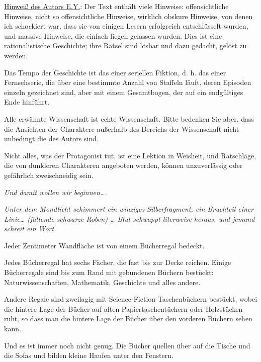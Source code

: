 

\hypertarget{ein-uxe4uuxdferst-unwahrscheinlicher-tag}{%

\uline{Hinweiß des Autors E.Y.}: Der Text enthält viele Hinweise: offensichtliche Hinweise, nicht so offensichtliche Hinweise, wirklich obskure Hinweise, von denen ich schockiert war, dass sie von einigen Lesern erfolgreich entschlüsselt wurden, und massive Hinweise, die einfach liegen gelassen wurden. Dies ist eine rationalistische Geschichte; ihre Rätsel sind lösbar und dazu gedacht, gelöst zu werden.

Das Tempo der Geschichte ist das einer seriellen Fiktion, d. h. das einer Fernsehserie, die über eine bestimmte Anzahl von Staffeln läuft, deren Episoden einzeln gezeichnet sind, aber mit einem Gesamtbogen, der auf ein endgültiges Ende hinführt.

Alle erwähnte Wissenschaft ist echte Wissenschaft. Bitte bedenken Sie aber, dass die Ansichten der Charaktere außerhalb des Bereichs der Wissenschaft nicht unbedingt die des Autors sind.

Nicht alles, was der Protagonist tut, ist eine Lektion in Weisheit, und Ratschläge, die von dunkleren Charakteren angeboten werden, können unzuverlässig oder gefährlich zweischneidig sein.

\emph{Und damit wollen wir beginnen….}

\emph{Unter dem Mondlicht schimmert ein winziges Silberfragment, ein Bruchteil einer Linie… (fallende schwarze Roben) … Blut schwappt literweise heraus, und jemand schreit ein Wort.}

Jeder Zentimeter Wandfläche ist von einem Bücherregal bedeckt.

Jedes Bücherregal hat sechs Fächer, die fast bis zur Decke reichen. Einige Bücherregale sind bis zum Rand mit gebundenen Büchern bestückt: Naturwissenschaften, Mathematik, Geschichte und alles andere.

Andere Regale sind zweilagig mit Science-Fiction-Taschenbüchern bestückt, wobei die hintere Lage der Bücher auf alten Papiertaschentüchern oder Holzstücken ruht, so dass man die hintere Lage der Bücher über den vorderen Büchern sehen kann.

Und es ist immer noch nicht genug. Die Bücher quellen über auf die Tische und die Sofas und bilden kleine Haufen unter den Fenstern.

}
